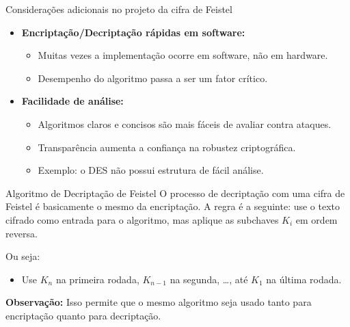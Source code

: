 \begin{frame}{Considerações adicionais no projeto da cifra de Feistel}
    \begin{itemize}
        \item \textbf{Encriptação/Decriptação rápidas em software:}
              \begin{itemize}
                  \item Muitas vezes a implementação ocorre em software, não em hardware.
                  \item Desempenho do algoritmo passa a ser um fator crítico.
              \end{itemize}

        \item \textbf{Facilidade de análise:}
              \begin{itemize}
                  \item Algoritmos claros e concisos são mais fáceis de avaliar contra ataques.
                  \item Transparência aumenta a confiança na robustez criptográfica.
                  \item Exemplo: o DES não possui estrutura de fácil análise.
              \end{itemize}
    \end{itemize}
\end{frame}
\begin{frame}{Algoritmo de Decriptação de Feistel}
    O processo de decriptação com uma cifra de Feistel é basicamente o mesmo da encriptação.
    A regra é a seguinte: use o texto cifrado como entrada para o algoritmo, mas aplique as subchaves \(K_i\) em ordem reversa.

    \vspace{0.5cm}
    Ou seja:
    \begin{itemize}
        \item Use \(K_n\) na primeira rodada, \(K_{n-1}\) na segunda, \dots, até \(K_1\) na última rodada.
    \end{itemize}

    \vspace{0.3cm}
    \textbf{Observação:} Isso permite que o mesmo algoritmo seja usado tanto para encriptação quanto para decriptação.
\end{frame}

